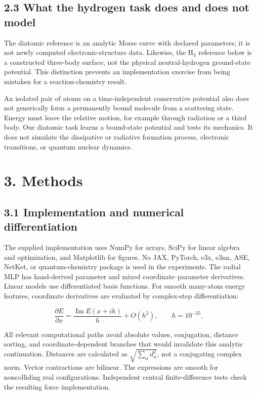 \documentclass[
  11pt,
  a4paper,
]{article}
\begin{document}
\hypertarget{what-the-hydrogen-task-does-and-does-not-model}{%
\subsection{2.3 What the hydrogen task does and does not
model}\label{what-the-hydrogen-task-does-and-does-not-model}}

The diatomic reference is an analytic Morse curve with declared
parameters; it is not newly computed electronic-structure data.
Likewise, the H\(_3\) reference below is a constructed three-body
surface, not the physical neutral-hydrogen ground-state potential. This
distinction prevents an implementation exercise from being mistaken for
a reaction-chemistry result.

An isolated pair of atoms on a time-independent conservative potential
also does not generically form a permanently bound molecule from a
scattering state. Energy must leave the relative motion, for example
through radiation or a third body. Our diatomic task learns a
bound-state potential and tests its mechanics. It does not simulate the
dissipative or radiative formation process, electronic transitions, or
quantum nuclear dynamics.

\hypertarget{methods}{%
\section{3. Methods}\label{methods}}

\hypertarget{implementation-and-numerical-differentiation}{%
\subsection{3.1 Implementation and numerical
differentiation}\label{implementation-and-numerical-differentiation}}

The supplied implementation uses NumPy for arrays, SciPy for linear
algebra and optimization, and Matplotlib for figures. No JAX, PyTorch,
e3x, e3nn, ASE, NetKet, or quantum-chemistry package is used in the
experiments. The radial MLP has hand-derived parameter and mixed
coordinate--parameter derivatives. Linear models use differentiated
basis functions. For smooth many-atom energy features, coordinate
derivatives are evaluated by complex-step differentiation:

\[\frac{\partial E}{\partial x}=\frac{\operatorname{Im}E(x+ih)}{h}+O(h^2),\qquad h=10^{-25}.\]

All relevant computational paths avoid absolute values, conjugation,
distance sorting, and coordinate-dependent branches that would
invalidate this analytic continuation. Distances are calculated as
\(\sqrt{\sum_\alpha d_\alpha^2}\), not a conjugating complex norm.
Vector contractions are bilinear. The expressions are smooth for
noncolliding real configurations. Independent central finite-difference
tests check the resulting force implementation.
\end{document}

